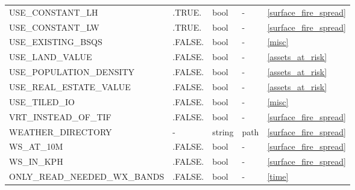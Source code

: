 \begin{landscape}
\begin{center}
\begin{longtable}{lllll}
USE\_CONSTANT\_LH                            & .TRUE.                     & bool                   & -                                  & \ref{surface_fire_spread}            \\
USE\_CONSTANT\_LW                            & .TRUE.                     & bool                   & -                                  & \ref{surface_fire_spread}            \\
USE\_EXISTING\_BSQS                          & .FALSE.                    & bool                   & -                                  & \ref{misc}                           \\
USE\_LAND\_VALUE                             & .FALSE.                    & bool                   & -                                  & \ref{assets_at_risk}                 \\
USE\_POPULATION\_DENSITY                     & .FALSE.                    & bool                   & -                                  & \ref{assets_at_risk}                 \\
USE\_REAL\_ESTATE\_VALUE                     & .FALSE.                    & bool                   & -                                  & \ref{assets_at_risk}                 \\
USE\_TILED\_IO                               & .FALSE.                    & bool                   & -                                  & \ref{misc}                           \\
VRT\_INSTEAD\_OF\_TIF                        & .FALSE.                    & bool                   & -                                  & \ref{surface_fire_spread}            \\
WEATHER\_DIRECTORY                           & -                          & string                 & path                               & \ref{surface_fire_spread}            \\
WS\_AT\_10M                                  & .FALSE.                    & bool                   & -                                  & \ref{surface_fire_spread}            \\
WS\_IN\_KPH                                  & .FALSE.                    & bool                   & -                                  & \ref{surface_fire_spread}            \\
ONLY\_READ\_NEEDED\_WX\_BANDS                & .FALSE.                    & bool                   & -                                  & \ref{time}                           \\

\end{longtable}
\end{center}
\end{landscape}
